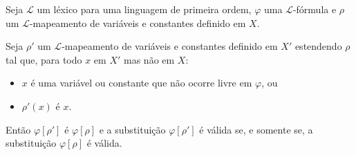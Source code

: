 \begin{metalemma}\label{mlem:substituicaoTrivialEmFormulas}
    Seja $\mathcal L$ um léxico para uma linguagem de primeira ordem, $\varphi$ uma $\mathcal L$-fórmula e $\rho$ um $\mathcal L$-mapeamento de variáveis e constantes definido em $X$.

    Seja $\rho'$ um $\mathcal L$-mapeamento de variáveis e constantes definido em $X'$ estendendo $\rho$ tal que, para todo $x$ em $X'$ mas não em $X$:
    \begin{itemize}
        \item $x$ é uma variável ou constante que não ocorre livre em $\varphi$, ou
        \item $\rho'(x)$ é $x$.
    \end{itemize}

    Então $\varphi[\rho']$ é $\varphi[\rho]$ e a substituição $\varphi[\rho']$ é válida se, e somente se, a substituição $\varphi[\rho]$ é válida.
\end{metalemma}
